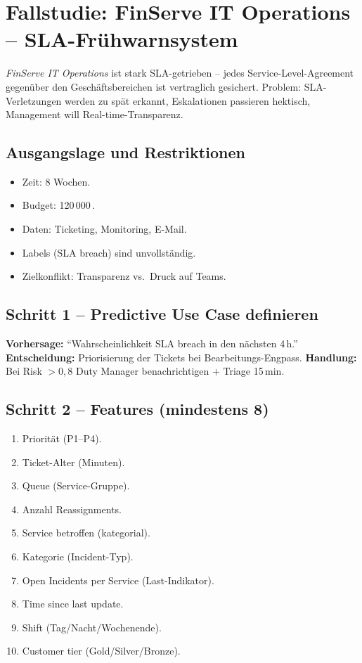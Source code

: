 \documentclass[11pt,a4paper,oneside]{article}
\begin{document}
\section{Fallstudie: FinServe IT Operations -- SLA-Frühwarnsystem}

\emph{FinServe IT Operations} ist stark SLA-getrieben -- jedes Service-Level-Agreement gegenüber den Geschäftsbereichen ist vertraglich gesichert. Problem: SLA-Verletzungen werden zu spät erkannt, Eskalationen passieren hektisch, Management will Real-time-Transparenz.

\subsection{Ausgangslage und Restriktionen}

\begin{itemize}
  \item Zeit: 8 Wochen.
  \item Budget: 120\,000\,\text{\euro}.
  \item Daten: Ticketing, Monitoring, E-Mail.
  \item Labels (SLA breach) sind unvollständig.
  \item Zielkonflikt: Transparenz vs.\ Druck auf Teams.
\end{itemize}

\subsection{Schritt 1 -- Predictive Use Case definieren}

\textbf{Vorhersage:} ``Wahrscheinlichkeit SLA breach in den nächsten 4\,h.''
\textbf{Entscheidung:} Priorisierung der Tickets bei Bearbeitungs-Engpass.
\textbf{Handlung:} Bei Risk $>0,8$ Duty Manager benachrichtigen + Triage 15\,min.

\subsection{Schritt 2 -- Features (mindestens 8)}

\begin{enumerate}
  \item Priorität (P1--P4).
  \item Ticket-Alter (Minuten).
  \item Queue (Service-Gruppe).
  \item Anzahl Reassignments.
  \item Service betroffen (kategorial).
  \item Kategorie (Incident-Typ).
  \item Open Incidents per Service (Last-Indikator).
  \item Time since last update.
  \item Shift (Tag/Nacht/Wochenende).
  \item Customer tier (Gold/Silver/Bronze).
\end{enumerate}
\end{document}
